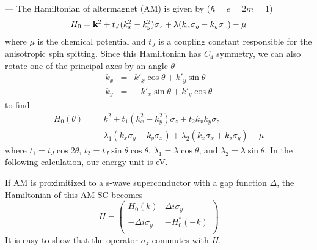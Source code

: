 \documentclass[aps, prb, twocolumn, amssymb, amsmath, showpacs, superscriptaddress]{revtex4-1}
\begin{document}
\bigskip

 ---
The Hamiltonian of altermagnet (AM) is given by ($\hbar=e =2m=1$)
\begin{eqnarray}
H_0 = {\bf k}^2 + t_J (k_x^2 -k_y^2)\sigma_z + \lambda (k_x \sigma_y - k_y \sigma_x) - \mu\nonumber
\end{eqnarray}
where $\mu$ is the chemical potential and $t_J$ is a coupling constant responsible for the anisotropic spin spitting. Since this Hamiltonian has $C_4$ symmetry, we can also rotate one of the principal axes by an angle $\theta$
\begin{eqnarray}
k_x &=& k'_x \cos\theta + k'_y \sin\theta \nonumber \\
k_y &=& -k'_x \sin\theta + k'_y \cos\theta \nonumber
\end{eqnarray}
to find
\begin{eqnarray}
H_0(\theta) &=& k^2 + t_1 (k_x^2 -k_y^2)\sigma_z + t_2 k_x k_y \sigma_z \nonumber\\
&+& \lambda_1 (k_x \sigma_y - k_y \sigma_x) + \lambda_2 (k_x \sigma_x + k_y \sigma_y)-\mu\label{ham1}
\end{eqnarray}
where $t_1 = t_J \cos2\theta$, $t_2 = t_J \sin\theta \cos\theta$, $\lambda_1 = \lambda \cos\theta$, and $\lambda_2 = \lambda \sin\theta$. In the following calculation, our energy unit is eV.

If AM is proximitized to a s-wave superconductor with a gap function $\Delta$, the Hamiltonian of this AM-SC becomes\cite{SC-Zhang, GM-Tang}
\begin{equation}
H = \left( \begin{matrix}
   {{H}_{0}}( k ) & \Delta i{{\sigma }_{y}}  \\
   -\Delta i{{\sigma }_{y}} & -H_{0}^{*}( -k )  \\
\end{matrix} \right)
\label{ham}
\end{equation}
It is easy to show that the operator ${\sigma}_z$ commutes with $H$\cite{note2}.

\bigskip
\end{document}
